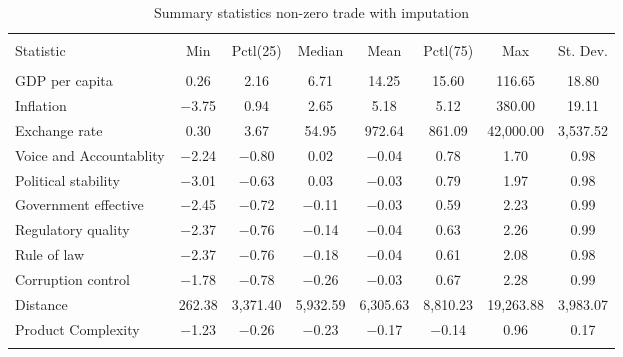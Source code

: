 
\begin{table}[H] \centering 
  \caption{Summary statistics non-zero trade with imputation} 
  \label{fig:sum_trade_imp} 
\begin{tabular}{@{\extracolsep{5pt}}lccccccc} 
\\[-1.8ex]\hline 
\hline \\[-1.8ex] 
Statistic & \multicolumn{1}{c}{Min} & \multicolumn{1}{c}{Pctl(25)} & \multicolumn{1}{c}{Median} & \multicolumn{1}{c}{Mean} & \multicolumn{1}{c}{Pctl(75)} & \multicolumn{1}{c}{Max} & \multicolumn{1}{c}{St. Dev.} \\ 
\hline \\[-1.8ex] 
GDP per capita & 0.26 & 2.16 & 6.71 & 14.25 & 15.60 & 116.65 & 18.80 \\ 
Inflation & $-$3.75 & 0.94 & 2.65 & 5.18 & 5.12 & 380.00 & 19.11 \\ 
Exchange rate & 0.30 & 3.67 & 54.95 & 972.64 & 861.09 & 42,000.00 & 3,537.52 \\ 
Voice and Accountablity & $-$2.24 & $-$0.80 & 0.02 & $-$0.04 & 0.78 & 1.70 & 0.98 \\ 
Political stability & $-$3.01 & $-$0.63 & 0.03 & $-$0.03 & 0.79 & 1.97 & 0.98 \\ 
Government effective & $-$2.45 & $-$0.72 & $-$0.11 & $-$0.03 & 0.59 & 2.23 & 0.99 \\ 
Regulatory quality & $-$2.37 & $-$0.76 & $-$0.14 & $-$0.04 & 0.63 & 2.26 & 0.99 \\ 
Rule of law & $-$2.37 & $-$0.76 & $-$0.18 & $-$0.04 & 0.61 & 2.08 & 0.98 \\ 
Corruption control & $-$1.78 & $-$0.78 & $-$0.26 & $-$0.03 & 0.67 & 2.28 & 0.99 \\ 
Distance & 262.38 & 3,371.40 & 5,932.59 & 6,305.63 & 8,810.23 & 19,263.88 & 3,983.07 \\ 
Product Complexity & $-$1.23 & $-$0.26 & $-$0.23 & $-$0.17 & $-$0.14 & 0.96 & 0.17 \\ 
\hline \\[-1.8ex] 
\end{tabular} 
\end{table} 
